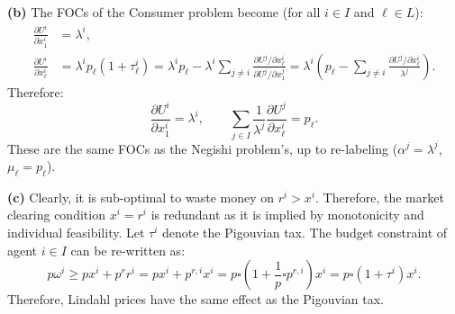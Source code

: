 \textbf{(b)} The FOCs of the Consumer problem become (for all $i \in I$ and $\ell \in L$):
\begin{align*}
\frac{\partial U^i}{\partial x_1^i} & = \lambda^i, \\
\frac{\partial U^i}{\partial x_\ell^i} & = \lambda^i p_\ell (1 + \tau_\ell^i)
= \lambda^i p_\ell - \lambda^i \sum_{j \neq i} \frac{\partial U^j / \partial x_\ell^i}{\partial U^j / \partial x_1^j}
= \lambda^i \left( p_\ell - \sum_{j \neq i} \frac{\partial U^j / \partial x_\ell^i}{\lambda^j} \right).
\end{align*}
Therefore:
\[
\frac{\partial U^i}{\partial x_1^i} = \lambda^i, \qquad \sum_{j \in I} \frac{1}{\lambda^j} \frac{\partial U^j}{\partial x_\ell^i} = p_\ell.
\]
These are the same FOCs as the Negishi problem's, up to re-labeling ($\alpha^j = \lambda^j$, $\mu_\ell = p_\ell$).

\textbf{(c)} Clearly, it is sub-optimal to waste money on $r^i > x^i$. Therefore, the market clearing condition $x^i = r^i$ is redundant as it is implied by monotonicity and individual feasibility. Let $\tau^i$ denote the Pigouvian tax. The budget constraint of agent $i \in I$ can be re-written as:
\[
p \omega^i \geq p x^i + p^r r^i = p x^i + p^{r,i} x^i = p \square \left( 1 + \frac{1}{p} \square p^{r,i} \right) x^i = p \square (1 + \tau^i) x^i.
\]
Therefore, Lindahl prices have the same effect as the Pigouvian tax.